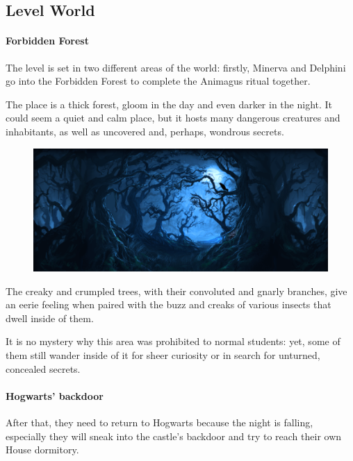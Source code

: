 \pagebreak

\subsection*{Level World}

\paragraph{Forbidden Forest}
The level is set in two different areas of the world: firstly, Minerva and Delphini go into the Forbidden Forest to complete the Animagus ritual together. 

The place is a thick forest, gloom in the day and even darker in the night. It could seem a quiet and calm place, but it hosts many dangerous creatures and inhabitants, as well as uncovered and, perhaps, wondrous secrets.

\begin{figure}[H]
\includegraphics[max width=\textwidth]{../Pictures/Level/World/Forbidden_forest_picture.png} 
\end{figure}

The creaky and crumpled trees, with their convoluted and gnarly branches, give an eerie feeling when paired with the buzz and creaks of various insects that dwell inside of them.

It is no mystery why this area was prohibited to normal students: yet, some of them still wander inside of it for sheer curiosity or in search for unturned, concealed secrets.

\paragraph{Hogwarts' backdoor}

After that, they need to return to Hogwarts because the night is falling, especially they will sneak into the castle's backdoor and try to reach their own House dormitory.

